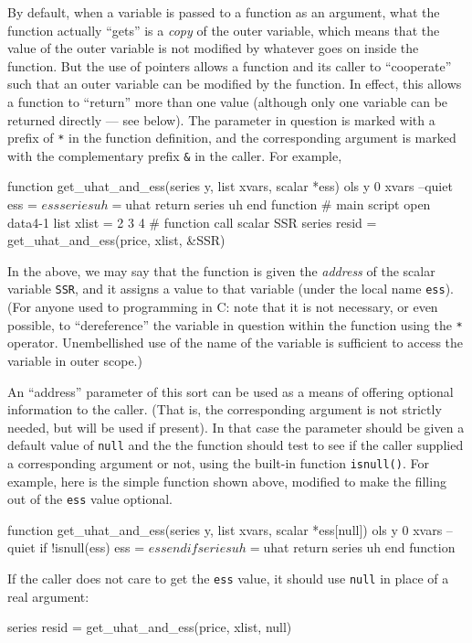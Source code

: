 By default, when a variable is passed to a function as an argument,
what the function actually ``gets'' is a \emph{copy} of the outer
variable, which means that the value of the outer variable is not
modified by whatever goes on inside the function.  But the use of
pointers allows a function and its caller to ``cooperate'' such that
an outer variable can be modified by the function.  In effect, this
allows a function to ``return'' more than one value (although only one
variable can be returned directly --- see below).  The parameter in
question is marked with a prefix of \texttt{*} in the function
definition, and the corresponding argument is marked with the
complementary prefix \verb+&+ in the caller.  For example,
%
\begin{code}
function get_uhat_and_ess(series y, list xvars, scalar *ess)
  ols y 0 xvars --quiet
  ess = $ess
  series uh = $uhat
  return series uh
end function
# main script
open data4-1
list xlist = 2 3 4
# function call
scalar SSR
series resid = get_uhat_and_ess(price, xlist, &SSR)
\end{code}
%
In the above, we may say that the function is given the \emph{address}
of the scalar variable \texttt{SSR}, and it assigns a value to that
variable (under the local name \texttt{ess}).  (For anyone used to
programming in C: note that it is not necessary, or even possible, to
``dereference'' the variable in question within the function using the
\texttt{*} operator.  Unembellished use of the name of the variable is
sufficient to access the variable in outer scope.)

An ``address'' parameter of this sort can be used as a means of
offering optional information to the caller.  (That is, the
corresponding argument is not strictly needed, but will be used if
present).  In that case the parameter should be given a default value
of \texttt{null} and the the function should test to see if the caller
supplied a corresponding argument or not, using the built-in function
\texttt{isnull()}.  For example, here is the simple function shown
above, modified to make the filling out of the \texttt{ess} value
optional.
%
\begin{code}
function get_uhat_and_ess(series y, list xvars, scalar *ess[null])
  ols y 0 xvars --quiet
  if !isnull(ess) 
     ess = $ess
  endif
  series uh = $uhat
  return series uh
end function
\end{code}
%
If the caller does not care to get the \texttt{ess} value, it should
use \texttt{null} in place of a real argument:
%
\begin{code}
series resid = get_uhat_and_ess(price, xlist, null)
\end{code}

